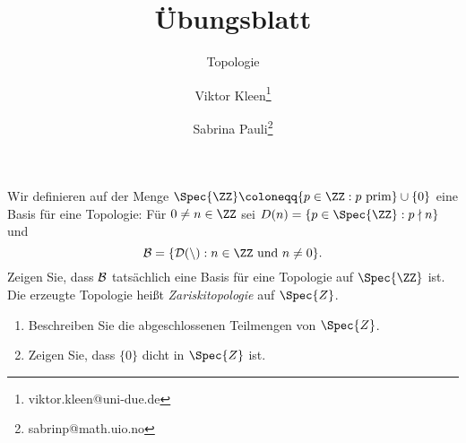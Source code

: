 

\setcounter{Sheet}{3}

\title{Übungsblatt \theSheet}
\subtitle{Topologie}
\author{Viktor Kleen\footnote{viktor.kleen@uni-due.de} \and Sabrina Pauli\footnote{sabrinp@math.uio.no}}
\date{}


\maketitle
\begin{exercise}
Wir definieren auf der Menge $\Spec{\ZZ} \coloneqq \{p\in\ZZ : \textnormal{$p$
prim}\}\cup \{0\}$ eine Basis für eine Topologie: Für $0\neq n\in\ZZ$
sei $D(n) = \{p\in\Spec{\ZZ} : p \nmid n\}$ und
\[
\cal B = \{ D(n) : \textnormal{$n\in\ZZ$ und $n\neq 0$}\}.
\]
Zeigen Sie, dass $\cal B$ tatsächlich eine Basis für eine Topologie auf
$\Spec{\ZZ}$ ist. Die erzeugte Topologie heißt \emph{Zariskitopologie}
auf $\Spec{Z}$.
\begin{enumerate}
\item Beschreiben Sie die abgeschlossenen Teilmengen von $\Spec{Z}$.
\item Zeigen Sie, dass $\{0\}$ dicht in $\Spec{Z}$ ist.
\end{enumerate}
\end{exercise}

